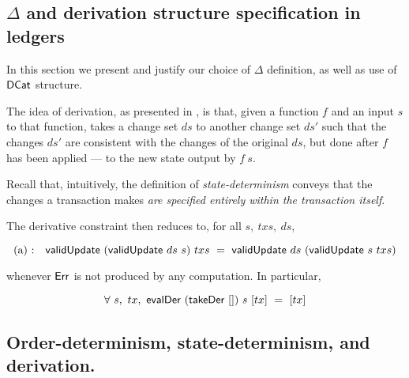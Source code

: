 \subsection{$\Delta$ and derivation structure specification in ledgers}

In this section we present and justify our choice of $\Delta$ definition, as well
as use of $\mathsf{DCat}$ structure.

The idea of derivation, as presented in \cite{changes}, is that,
given a function $f$ and an input $s$ to that function, takes a change set $ds$ to another change set $ds'$
such that the changes $ds'$ are consistent with the changes of the original $ds$,
but done after $f$ has been applied --- to the new state output by $f~s$.

Recall that, intuitively, the definition of \emph{state-determinism} conveys that the changes
a transaction makes \emph{are specified entirely within the transaction itself}.


The derivative constraint then reduces to, for all $s,~txs,~ds$,

\[\text{(a)~:~~~} \mathsf{validUpdate}~ (\mathsf{validUpdate}~ ds~ s) ~txs~=~\mathsf{validUpdate} ~ds~(\mathsf{validUpdate}~ s ~txs) \]

whenever $\mathsf{Err}$ is not produced by any computation. In particular,

\[ \forall~s,~tx,~\mathsf{evalDer} ~(\mathsf{takeDer}~ []) ~s~ [tx] ~=~[tx] \]


\subsection{Order-determinism, state-determinism, and derivation.~}
\label{sec:od-sd-d}




